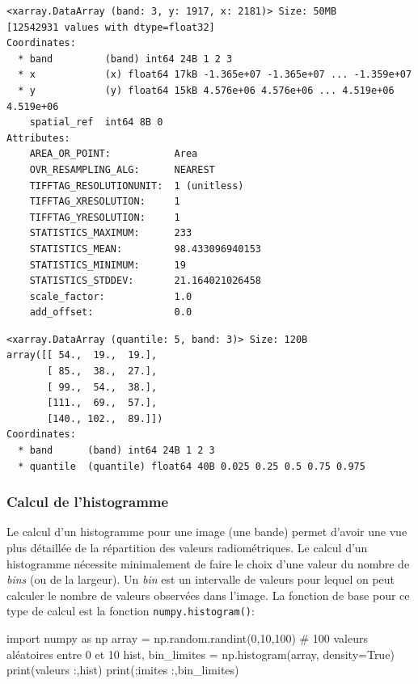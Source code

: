 \documentclass[
  11pt,
  letterpaper,
  open=any,
  twoside=false,
  french]{scrbook}
\newenvironment{Shaded}{\begin{snugshade}}{\end{snugshade}}
\newcommand{\BuiltInTok}[1]{\textcolor[rgb]{0.00,0.23,0.31}{#1}}
\newcommand{\CommentTok}[1]{\textcolor[rgb]{0.37,0.37,0.37}{#1}}
\newcommand{\DecValTok}[1]{\textcolor[rgb]{0.68,0.00,0.00}{#1}}
\newcommand{\ImportTok}[1]{\textcolor[rgb]{0.00,0.46,0.62}{#1}}
\newcommand{\NormalTok}[1]{\textcolor[rgb]{0.00,0.23,0.31}{#1}}
\newcommand{\OperatorTok}[1]{\textcolor[rgb]{0.37,0.37,0.37}{#1}}
\newcommand{\StringTok}[1]{\textcolor[rgb]{0.13,0.47,0.30}{#1}}
\newcommand{\VariableTok}[1]{\textcolor[rgb]{0.07,0.07,0.07}{#1}}
\begin{document}
\begin{verbatim}
<xarray.DataArray (band: 3, y: 1917, x: 2181)> Size: 50MB
[12542931 values with dtype=float32]
Coordinates:
  * band         (band) int64 24B 1 2 3
  * x            (x) float64 17kB -1.365e+07 -1.365e+07 ... -1.359e+07
  * y            (y) float64 15kB 4.576e+06 4.576e+06 ... 4.519e+06 4.519e+06
    spatial_ref  int64 8B 0
Attributes:
    AREA_OR_POINT:           Area
    OVR_RESAMPLING_ALG:      NEAREST
    TIFFTAG_RESOLUTIONUNIT:  1 (unitless)
    TIFFTAG_XRESOLUTION:     1
    TIFFTAG_YRESOLUTION:     1
    STATISTICS_MAXIMUM:      233
    STATISTICS_MEAN:         98.433096940153
    STATISTICS_MINIMUM:      19
    STATISTICS_STDDEV:       21.164021026458
    scale_factor:            1.0
    add_offset:              0.0
\end{verbatim}

\begin{verbatim}
<xarray.DataArray (quantile: 5, band: 3)> Size: 120B
array([[ 54.,  19.,  19.],
       [ 85.,  38.,  27.],
       [ 99.,  54.,  38.],
       [111.,  69.,  57.],
       [140., 102.,  89.]])
Coordinates:
  * band      (band) int64 24B 1 2 3
  * quantile  (quantile) float64 40B 0.025 0.25 0.5 0.75 0.975
\end{verbatim}

\subsubsection{Calcul de l'histogramme}\label{calcul-de-lhistogramme}

Le calcul d'un histogramme pour une image (une bande) permet d'avoir une
vue plus détaillée de la répartition des valeurs radiométriques. Le
calcul d'un histogramme nécessite minimalement de faire le choix d'une
valeur du nombre de \emph{bins} (ou de la largeur). Un \emph{bin} est un
intervalle de valeurs pour lequel on peut calculer le nombre de valeurs
observées dans l'image. La fonction de base pour ce type de calcul est
la fonction \texttt{numpy.histogram()}:

\begin{Shaded}
\begin{Highlighting}[]
\ImportTok{import}\NormalTok{ numpy }\ImportTok{as}\NormalTok{ np}
\NormalTok{array }\OperatorTok{=}\NormalTok{ np.random.randint(}\DecValTok{0}\NormalTok{,}\DecValTok{10}\NormalTok{,}\DecValTok{100}\NormalTok{) }\CommentTok{\# 100 valeurs aléatoires entre 0 et 10}
\NormalTok{hist, bin\_limites }\OperatorTok{=}\NormalTok{ np.histogram(array, density}\OperatorTok{=}\VariableTok{True}\NormalTok{)}
\BuiltInTok{print}\NormalTok{(}\StringTok{\textquotesingle{}valeurs :\textquotesingle{}}\NormalTok{,hist)}
\BuiltInTok{print}\NormalTok{(}\StringTok{\textquotesingle{};imites :\textquotesingle{}}\NormalTok{,bin\_limites)}
\end{Highlighting}
\end{Shaded}
\end{document}
